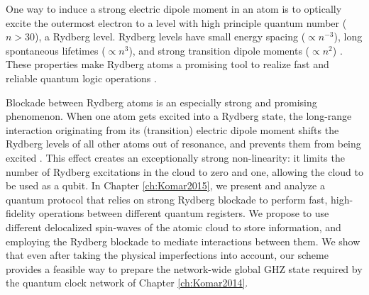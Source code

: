 One way to induce a strong electric dipole moment in an atom is to optically
excite the outermost electron to a level with high principle quantum number ($n
> 30$), a Rydberg level. Rydberg levels have small energy spacing
($\propto n^{-3}$), long spontaneous lifetimes ($\propto n^3$), and strong
transition dipole moments ($\propto n^2$) \cite{Saffman2010}. These properties
make Rydberg atoms a promising tool to realize fast and reliable quantum
logic operations \cite{Lukin2001}.  

Blockade between Rydberg atoms is an especially strong and promising phenomenon.
When one atom gets excited into a Rydberg state, the long-range interaction
originating from its (transition) electric dipole moment shifts the Rydberg
levels of all other atoms out of resonance, and prevents them from being excited
\cite{Urban2009}. This effect creates an exceptionally strong non-linearity: it
limits the number of Rydberg excitations in the cloud to zero and one, allowing
the cloud to be used as a qubit. In Chapter \ref{ch:Komar2015}, we present and
analyze a quantum protocol that relies on strong Rydberg blockade to perform
fast, high-fidelity operations between different quantum registers. We propose
to use different delocalized spin-waves of the atomic cloud to store
information, and employing the Rydberg blockade to mediate interactions between
them. We show that even after taking the physical imperfections into account,
our scheme provides a feasible way to prepare the network-wide global GHZ state
required by the quantum clock network of Chapter \ref{ch:Komar2014}.

 









